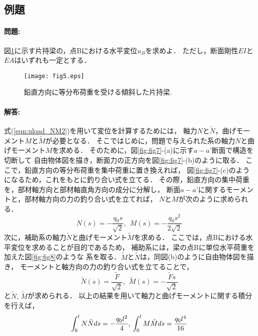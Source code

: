 ﻿\documentclass[10pt,a4j]{jarticle}
\begin{document}
\subsection{例題}
\paragraph{問題:}
図\ref{fig:fig5}に示す片持梁の，点Bにおける水平変位$u_B$を求めよ．
ただし，断面剛性$EI$と$EA$はいずれも一定とする．
\begin{figure}[h]
	\begin{center}
	\texttt{[image: fig5.eps]} 
	\end{center}
	\caption{鉛直方向に等分布荷重を受ける傾斜した片持梁.} 
	\label{fig:fig5}
\end{figure}
\paragraph{解答:}
式(\ref{eqn:uload_NM2})を用いて変位を計算するためには，
軸力$N$と$\tilde N$，曲げモーメント$M$と$\tilde M$が必要となる．
そこではじめに，問題で与えられた系の軸力$N$と曲げモーメント$M$を求める．
そのために，図\ref{fig:fig7}-(a)に示す$a-a’$断面で構造を切断して
自由物体図を描き，断面力の正方向を図\ref{fig:fig7}-(b)のように取る．
ここで，鉛直方向の等分布荷重を集中荷重に置き換えれば，
図\ref{fig:fig7}-(c)のようになるため，これをもとに釣り合い式を立てる．
その際，鉛直方向の集中荷重を，部材軸方向と部材軸直角方向の成分に分解し，
断面$a-a’$に関するモーメントと，部材軸方向の力の釣り合い式を立てれば，
$N$と$M$が次のように求められる．\\
\begin{equation}
	N(s)=-\frac{q_0s}{\sqrt{2}}, \ \ 
	M(s)=-\frac{q_0s^2}{2\sqrt{2}}
	\label{eqn:}
\end{equation}
次に，補助系の軸力$\tilde N$と曲げモーメント$\tilde M$を求める．
ここでは，点Bにおける水平変位を求めることが目的であるため，
補助系には，梁の点Bに単位水平荷重を加えた図\ref{fig:fig8}のような
系を取る．$\tilde M$と$\tilde N$は，同図(b)のように自由物体図を描き，
モーメントと軸方向の力の釣り合い式を立てることで，
\begin{equation}
	\tilde N(s)=\frac{\tilde F}{\sqrt{2}}, \ \ 
	\tilde M(s)=-\frac{\tilde F s}{\sqrt{2}}
	\label{eqn:}
\end{equation}
と$\tilde N, \, \tilde M$が求められる．
以上の結果を用いて軸力と曲げモーメントに関する積分を行えば，
\begin{equation}
	\int_0^l N \tilde N ds = -\frac{q_0l^2}{4}, \\
	\int_0^l M \tilde M ds = \frac{q_0l^4}{16}
	\label{eqn:}
\end{equation}
\end{document}
